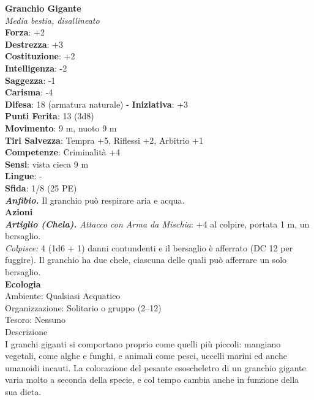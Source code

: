 \begin{multicols}{2}
\medskip\textbf{Granchio Gigante}\\
\emph{Media bestia, disallineato}\\
\textbf{Forza}: +2\\
\textbf{Destrezza}: +3\\
\textbf{Costituzione}: +2\\
\textbf{Intelligenza}: -2\\
\textbf{Saggezza}: -1\\
\textbf{Carisma}: -4\\
\textbf{Difesa}: 18 (armatura naturale) - \textbf{Iniziativa}: +3\\
\textbf{Punti Ferita}: 13 (3d8)\\
\textbf{Movimento}: 9 m, nuoto 9 m\\
\textbf{Tiri Salvezza}: Tempra +5, Riflessi +2, Arbitrio +1 \\
\textbf{Competenze}: Criminalità +4\\
\textbf{Sensi}: vista cieca 9 m\\
\textbf{Lingue}: -\\
\textbf{Sfida}: 1/8 (25 PE)\smallskip\\
\emph{\textbf{Anfibio.}} Il granchio può respirare aria e acqua.\\
\smallskip\textbf{Azioni}\\
\emph{\textbf{Artiglio (Chela).} Attacco con Arma da Mischia}: +4 al colpire, portata 1 m,  un bersaglio.\\
\emph{Colpisce:} 4 (1d6 + 1) danni contundenti e il bersaglio è afferrato (DC  12 per fuggire). Il granchio ha due chele, ciascuna delle quali può afferrare un solo bersaglio.\\
\textbf{Ecologia}\\
Ambiente: Qualsiasi Acquatico\\
Organizzazione: Solitario o gruppo (2–12)\\
Tesoro: Nessuno\\
Descrizione\\

I granchi giganti si comportano proprio come quelli più piccoli: mangiano vegetali, come alghe e funghi, e animali come pesci, uccelli marini ed anche umanoidi incauti. La colorazione del pesante esoscheletro di un granchio gigante varia molto a seconda della specie, e col tempo cambia anche in funzione della sua dieta. \\


\end{multicols}
